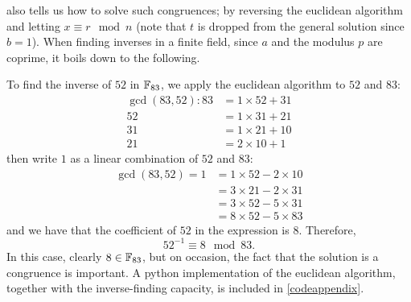  also tells us how to solve such congruences; by reversing the euclidean algorithm and letting $x \equiv r \mod n$ (note that $t$ is dropped from the general solution since $b = 1$). %
When finding inverses in a finite field, since $a$ and the modulus $p$ are coprime, it boils down to the following.

To find the inverse of $52$ in $\fp[83]$, we apply the euclidean algorithm to $52$ and $83$:
\begin{align*}
	\gcd(83,52): 83 &= 1 \times 52 + 31\\
	52 &= 1 \times 31 + 21\\
	31 &= 1 \times 21 + 10\\
	21 &= 2 \times 10 + 1
\end{align*}
then write $1$ as a linear combination of $52$ and $83$:
\begin{align*}
	\gcd(83,52) = 1 &= 1 \times 52 - 2 \times 10 \\
	&= 3 \times 21 - 2 \times 31 \\
	&= 3 \times 52 - 5 \times 31 \\
	&= 8 \times 52 - 5 \times 83 
\end{align*}
and we have that the coefficient of $52$ in the expression is $8$. Therefore,
$$52^{-1} \equiv 8 \mod 83.$$
In this case, clearly $8 \in \fp[83]$, but on occasion, the fact that the solution is a congruence is important.
A python implementation of the euclidean algorithm, together with the inverse-finding capacity, is included in \cref{codeappendix}.
